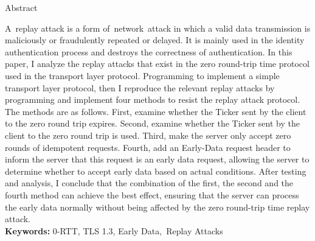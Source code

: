 \begin{center}
  Abstract
\end{center}
\begin{spacing}{1.5}
  A replay attack is a form of network attack in which a valid data transmission is maliciously or fraudulently repeated or delayed. It is mainly used in the identity authentication process and destroys the correctness of authentication. In this paper, I analyze the replay attacks that exist in the zero round-trip time protocol used in the transport layer protocol. Programming to implement a simple transport layer protocol, then I reproduce the relevant replay attacks by programming and implement four methods to resist the replay attack protocol. The methods are as follows. First, examine whether the Ticker sent by the client to the zero round trip expires. Second, examine whether the Ticker sent by the client to the zero round trip is used. Third, make the server only accept zero rounds of idempotent requests. Fourth, add an Early-Data request header to inform the server that this request is an early data request, allowing the server to determine whether to accept early data based on actual conditions. After testing and analysis, I conclude that the combination of the first, the second and the fourth method can achieve the best effect, ensuring that the server can process the early data normally without being affected by the zero round-trip time replay attack.
  \ \\
  \textbf{Keywords: }0-RTT, TLS 1.3, Early Data,\ Replay Attacks
\end{spacing}
\newpage